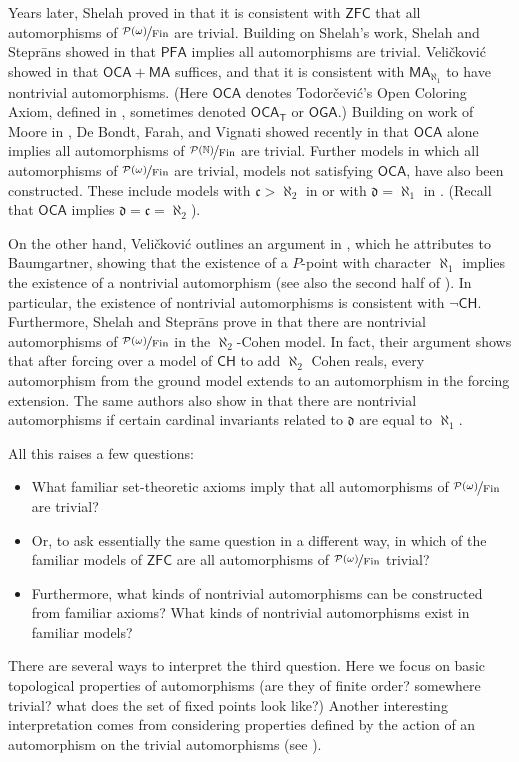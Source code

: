 \documentclass[11pt,leqno]{amsart}
\theoremstyle{definition}
\theoremstyle{remark}
\newcommand{\N}{\mathbb{N}}
\newcommand{\<}{\langle}
\renewcommand{\>}{\rangle}
\newcommand{\w}{\omega}
\newcommand{\0}{\emptyset}
\newcommand{\1}{1\hspace{-1.75mm}1}
\newcommand{\pwmf}{\nicefrac{\mathcal{P}(\w)}{\mathrm{Fin}}}
\newcommand{\pnmf}{\nicefrac{\mathcal{P}(\N)}{\mathrm{Fin}}}
\newcommand{\continuum}{\mathfrak{c}}
\newcommand{\dom}{\mathfrak d}
\newcommand{\ch}{\ensuremath{\mathsf{CH}}\xspace}
\newcommand{\zfc}{\ensuremath{\mathsf{ZFC}}\xspace}
\newcommand{\pfa}{\ensuremath{\mathsf{PFA}}\xspace}
\newcommand{\ocama}{\ensuremath{\mathsf{OCA + MA}}\xspace}
\newcommand{\oca}{\ensuremath{\mathsf{OCA}}\xspace}
\begin{document}
Years later, Shelah proved in \cite[Chapter 4]{Shelah} that it is consistent with \zfc that all automorphisms of $\pwmf$ are trivial. 
Building on Shelah's work, Shelah and Stepr\={a}ns showed in \cite{SS} that \pfa implies all automorphisms are trivial. Veli\v{c}kovi\'c showed in \cite{Velickovic} that \ocama suffices, and that it is consistent with $\mathsf{MA}_{\aleph_1}$ to have nontrivial automorphisms. (Here $\mathsf{OCA}$ denotes Todor\v{c}evi\'c's Open Coloring Axiom, defined in \cite{Todorcevic}, sometimes denoted $\mathsf{OCA_T}$ or $\mathsf{OGA}$.) 
Building on work of Moore in \cite{Moore}, De Bondt, Farah, and Vignati showed recently in \cite{DFV} that \oca alone implies all automorphisms of $\pnmf$ are trivial. 
Further models in which all automorphisms of $\pwmf$ are trivial, models not satisfying $\mathsf{OCA}$,  have also been constructed. These include models with $\continuum > \aleph_2$ in \cite{Dow} or with $\dom = \aleph_1$ in \cite{FarSh}. (Recall that \oca implies $\dom = \continuum = \aleph_2$).

On the other hand, Veli\v{c}kovi\'c outlines an argument in \cite{Vel}, which he attributes to Baumgartner, showing that the existence of a $P$-point with character $\aleph_1$ implies the existence of a nontrivial automorphism (see also the second half of \cite{SS1}). In particular, the existence of nontrivial automorphisms is consistent with $\neg$\ch. 
Furthermore, Shelah and Stepr\={a}ns prove in \cite{SS1} that there are nontrivial automorphisms of $\pwmf$ in the $\aleph_2$-Cohen model. In fact, their argument shows that after forcing over a model of \ch to add $\aleph_2$ Cohen reals, every automorphism from the ground model extends to an automorphism in the forcing extension. 
The same authors also show in \cite{SS3} that there are nontrivial automorphisms if certain cardinal invariants related to $\dom$ are equal to $\aleph_1$. 

All this raises a few questions: 
\begin{itemize}
\item[$\circ$] What familiar set-theoretic axioms imply that all automorphisms of $\pwmf$ are trivial? 
\item[$\circ$] Or, to ask essentially the same question in a different way, in which of the familiar models of \zfc are all automorphisms of $\pwmf$ trivial?
\item[$\circ$] Furthermore, what kinds of nontrivial automorphisms can be constructed from familiar axioms? What kinds of nontrivial automorphisms exist in familiar models?
\end{itemize}
There are several ways to interpret the third question. Here we focus on basic topological properties of automorphisms (are they of finite order? somewhere trivial? what does the set of fixed points look like?) 
Another interesting interpretation comes from considering properties defined by the action of an automorphism on the trivial automorphisms (see \cite{WBshift,BF}). 
\end{document}
